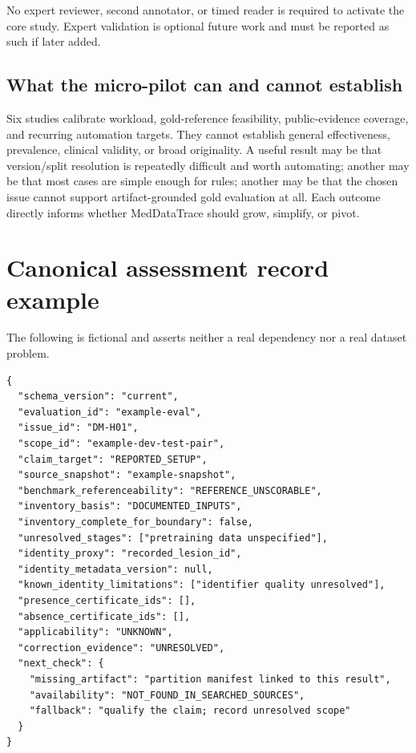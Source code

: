 \documentclass[11pt,a4paper]{article}
\begin{document}
No expert reviewer, second annotator, or timed reader is required to activate the core study. Expert validation is optional future work and must be reported as such if later added.

\subsection{What the micro-pilot can and cannot establish}
Six studies calibrate workload, gold-reference feasibility, public-evidence coverage, and recurring automation targets. They cannot establish general effectiveness, prevalence, clinical validity, or broad originality. A useful result may be that version/split resolution is repeatedly difficult and worth automating; another may be that most cases are simple enough for rules; another may be that the chosen issue cannot support artifact-grounded gold evaluation at all. Each outcome directly informs whether MedDataTrace should grow, simplify, or pivot.

\appendix
\section{Canonical assessment record example}
The following is fictional and asserts neither a real dependency nor a real dataset problem.
\begin{lstlisting}
{
  "schema_version": "current",
  "evaluation_id": "example-eval",
  "issue_id": "DM-H01",
  "scope_id": "example-dev-test-pair",
  "claim_target": "REPORTED_SETUP",
  "source_snapshot": "example-snapshot",
  "benchmark_referenceability": "REFERENCE_UNSCORABLE",
  "inventory_basis": "DOCUMENTED_INPUTS",
  "inventory_complete_for_boundary": false,
  "unresolved_stages": ["pretraining data unspecified"],
  "identity_proxy": "recorded_lesion_id",
  "identity_metadata_version": null,
  "known_identity_limitations": ["identifier quality unresolved"],
  "presence_certificate_ids": [],
  "absence_certificate_ids": [],
  "applicability": "UNKNOWN",
  "correction_evidence": "UNRESOLVED",
  "next_check": {
    "missing_artifact": "partition manifest linked to this result",
    "availability": "NOT_FOUND_IN_SEARCHED_SOURCES",
    "fallback": "qualify the claim; record unresolved scope"
  }
}
\end{lstlisting}
\end{document}
